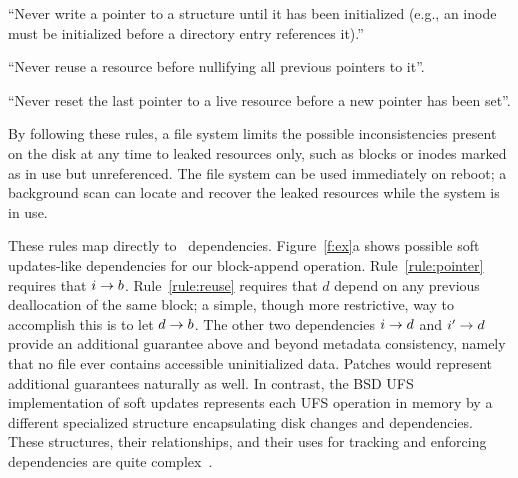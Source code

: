 \begin{compactenumerate}
\item \label{rule:pointer} ``Never write a pointer to a structure until it
 has been initialized (e.g., an inode must be initialized before a
 directory entry references it).''
\item \label{rule:reuse} ``Never reuse a resource before nullifying all
 previous pointers to it''.
\item \label{rule:overwrite} ``Never reset the last pointer to a live
 resource before a new pointer has been set''.
\end{compactenumerate}

\noindent
By following these rules, a file system limits the possible inconsistencies
present on the disk at any time to leaked resources only, such as blocks or inodes
marked as in use but unreferenced. The file system can be used immediately
 on reboot; a background scan can locate and recover the leaked resources
 while the system is in use.

These rules map directly to \patch\ dependencies.
%
Figure~\ref{f:ex}a shows possible soft updates-like dependencies for
 our block-append operation.
%
%
%
%
Rule~\ref{rule:pointer} requires that $i \rightarrow b$.
%
Rule~\ref{rule:reuse} requires that $d$ depend on any
previous deallocation of the same block;
%
a simple, though more restrictive, way to accomplish this is to let $d
 \rightarrow b$.
%
The other two dependencies $i \rightarrow d$ and $i' \rightarrow d$ provide an
 additional guarantee above and beyond metadata consistency, namely
 that no file ever contains accessible uninitialized data.
%
Patches would represent additional guarantees naturally as well.
%
In contrast, the BSD UFS implementation of soft updates represents each UFS
 operation in memory by a different specialized structure encapsulating
 disk changes and dependencies.
These structures, their
relationships, and their uses for tracking and enforcing
dependencies are quite complex~\cite{mckusick99soft}.

